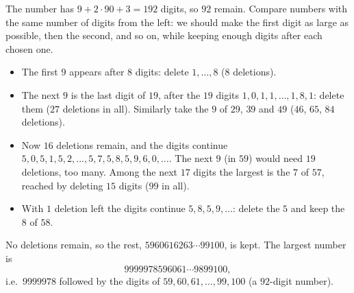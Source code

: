 The number has $9+2\cdot90+3=192$ digits, so $92$ remain. Compare numbers with the same number of digits from the left: we should make the first digit as large as possible, then the second, and so on, while keeping enough digits after each chosen one.

\begin{itemize}
\item The first $9$ appears after $8$ digits: delete $1,\dots,8$ ($8$ deletions).
\item The next $9$ is the last digit of $19$, after the $19$ digits $1,0,1,1,\dots,1,8,1$: delete them ($27$ deletions in all). Similarly take the $9$ of $29$, $39$ and $49$ ($46$, $65$, $84$ deletions).
\item Now $16$ deletions remain, and the digits continue $5,0,5,1,5,2,\dots,5,7,5,8,5,9,6,0,\dots$. The next $9$ (in $59$) would need $19$ deletions, too many. Among the next $17$ digits the largest is the $7$ of $57$, reached by deleting $15$ digits ($99$ in all).
\item With $1$ deletion left the digits continue $5,8,5,9,\dots$: delete the $5$ and keep the $8$ of $58$.
\end{itemize}
No deletions remain, so the rest, $5960616263\cdots99100$, is kept. The largest number is
\[
\boxed{9999978596061\cdots9899100},
\]
i.e.\ $9999978$ followed by the digits of $59,60,61,\dots,99,100$ (a $92$-digit number).
